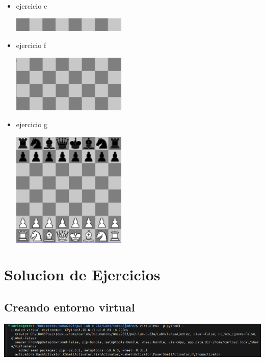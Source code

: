 \documentclass{article}
\begin{document}
\begin{itemize}
\begin{itemize}
\begin{itemize}
			            \item ejercicio e
			                  \begin{center}
				                  \includegraphics[width=154.6776pt,height=18.96048pt]{img/ejercicio_02_e.png}
			                  \end{center}

			            \item ejercicio f
			                  \begin{center}
				                  \includegraphics[width=154.6881pt,height=77.01212pt]{img/ejercicio_02_f.png}
			                  \end{center}

			            \item ejercicio g
			                  \begin{center}
				                  \includegraphics[width=154.6824pt,height=155.0165pt]{img/ejercicio_02_g.png}
			                  \end{center}
		            \end{itemize}
	      \end{itemize}
\end{itemize}
\section{Solucion de Ejercicios}
\subsection{Creando entorno virtual}
\begin{center}
	\includegraphics[scale=0.45]{img/entornoVirtual.png}
\end{center}
\end{document}
